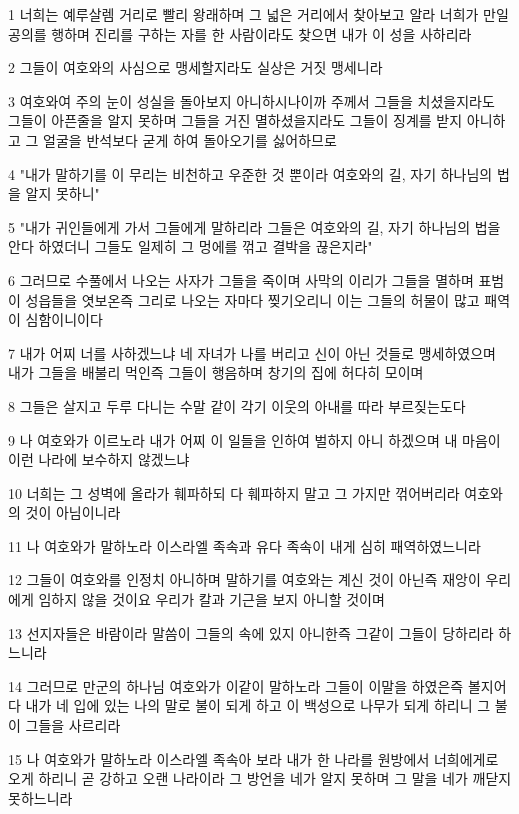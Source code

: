 \par 1 너희는 예루살렘 거리로 빨리 왕래하며 그 넓은 거리에서 찾아보고 알라 너희가 만일 공의를 행하며 진리를 구하는 자를 한 사람이라도 찾으면 내가 이 성을 사하리라
\par 2 그들이 여호와의 사심으로 맹세할지라도 실상은 거짓 맹세니라
\par 3 여호와여 주의 눈이 성실을 돌아보지 아니하시나이까 주께서 그들을 치셨을지라도 그들이 아픈줄을 알지 못하며 그들을 거진 멸하셨을지라도 그들이 징계를 받지 아니하고 그 얼굴을 반석보다 굳게 하여 돌아오기를 싫어하므로
\par 4 "내가 말하기를 이 무리는 비천하고 우준한 것 뿐이라 여호와의 길, 자기 하나님의 법을 알지 못하니"
\par 5 "내가 귀인들에게 가서 그들에게 말하리라 그들은 여호와의 길, 자기 하나님의 법을 안다 하였더니 그들도 일제히 그 멍에를 꺾고 결박을 끊은지라"
\par 6 그러므로 수풀에서 나오는 사자가 그들을 죽이며 사막의 이리가 그들을 멸하며 표범이 성읍들을 엿보온즉 그리로 나오는 자마다 찢기오리니 이는 그들의 허물이 많고 패역이 심함이니이다
\par 7 내가 어찌 너를 사하겠느냐 네 자녀가 나를 버리고 신이 아닌 것들로 맹세하였으며 내가 그들을 배불리 먹인즉 그들이 행음하며 창기의 집에 허다히 모이며
\par 8 그들은 살지고 두루 다니는 수말 같이 각기 이웃의 아내를 따라 부르짖는도다
\par 9 나 여호와가 이르노라 내가 어찌 이 일들을 인하여 벌하지 아니 하겠으며 내 마음이 이런 나라에 보수하지 않겠느냐
\par 10 너희는 그 성벽에 올라가 훼파하되 다 훼파하지 말고 그 가지만 꺾어버리라 여호와의 것이 아님이니라
\par 11 나 여호와가 말하노라 이스라엘 족속과 유다 족속이 내게 심히 패역하였느니라
\par 12 그들이 여호와를 인정치 아니하며 말하기를 여호와는 계신 것이 아닌즉 재앙이 우리에게 임하지 않을 것이요 우리가 칼과 기근을 보지 아니할 것이며
\par 13 선지자들은 바람이라 말씀이 그들의 속에 있지 아니한즉 그같이 그들이 당하리라 하느니라
\par 14 그러므로 만군의 하나님 여호와가 이같이 말하노라 그들이 이말을 하였은즉 볼지어다 내가 네 입에 있는 나의 말로 불이 되게 하고 이 백성으로 나무가 되게 하리니 그 불이 그들을 사르리라
\par 15 나 여호와가 말하노라 이스라엘 족속아 보라 내가 한 나라를 원방에서 너희에게로 오게 하리니 곧 강하고 오랜 나라이라 그 방언을 네가 알지 못하며 그 말을 네가 깨닫지 못하느니라
